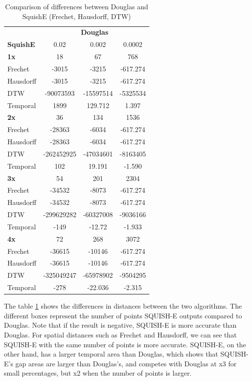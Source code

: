 \begin{table}[htbp]
	\centering
	\label{tab:douglas_vs_squish_comparison}
	\begin{tabular}{@{}lccc@{}}
		\toprule
		& \multicolumn{3}{c}{\textbf{Douglas}} \\
		\cmidrule(l){2-4}
		\textbf{SquishE} & 0.02 & 0.002 & 0.0002 \\
		\midrule
		\textbf{1x} 	& 18 	& 67 & 768 \\
		Frechet 		& -3015 & -3215 & -617.274 \\
		Hausdorff 		& -3015 	& -3215 & -617.274 \\
		DTW 			& -90073593 	& -15597514 & -5325534 \\
		Temporal 		& 1899 	& 129.712 & 1.397 \\ \midrule
		\textbf{2x} 	& 36 & 134 & 1536 \\
		Frechet 		& -28363 & -6034 & -617.274 \\
		Hausdorff 		& -28363 & -6034 & -617.274 \\
		DTW  		& -262452925 & -47034601 & -8163405 \\
		Temporal 	& 102 & 19.191 & -1.590 \\ \midrule
		\textbf{3x} 	& 54 & 201 & 2304 \\
		Frechet 		& -34532 & -8073 & -617.274 \\
		Hausdorff 		& -34532 & -8073 & -617.274 \\
		DTW 		& -299629282 & -60327008 & -9036166 \\
		Temporal 			& -149 & -12.72 & -1.933 \\ \midrule
		\textbf{4x} 	& 72 & 268 & 3072 \\
		Frechet 		& -36615 & -10146 & -617.274 \\
		Hausdorff 		& -36615 & -10146 & -617.274 \\
		DTW 		& -325049247 & -65978902 & -9504295 \\
		Temporal 			& -278 & -22.036 & -2.315 \\
		\bottomrule
	\end{tabular}
	\caption{Comparison of differences between Douglas and SquishE (Frechet, Hausdorff, DTW)}
\end{table}

The table \ref{tab:douglas_vs_squish_comparison} shows the differences in distances between the two algorithms. The different boxes represent the number of points SQUISH-E outputs compared to Douglas.
Note that if the result is negative, SQUISH-E is more accurate than Douglas. For spatial distances such as Frechet and Hausdorff, we can see that SQUISH-E with the same number of points is more accurate. SQUISH-E, on the other hand, has a larger temporal area than Douglas, which shows that SQUISH-E's gap areas are larger than Douglas's, and competes with Douglas at x3 for small percentages, but x2 when the number of points is larger.



